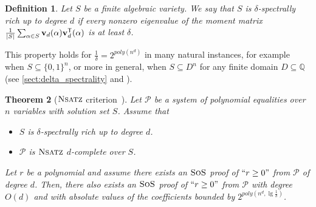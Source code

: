 \documentclass[11pt]{article}
\newcommand{\sos}{\text{\sc{SoS}}}
\newcommand{\Nsatz}{\textsc{Nsatz}}
\newcommand{\1}{\textbf{1}}
\newtheorem{theorem}{Theorem}[section]
\newtheorem{definition}[theorem]{Definition}
\begin{document}
\begin{definition}
    Let $S$ be a finite algebraic variety. We say that $S$ is $\delta$-spectrally rich up to degree $d$ if every nonzero eigenvalue of the moment matrix $\frac{1}{|S|} \sum_{\alpha \in S} \mathbf{v}_d(\alpha)\mathbf{v}_d^{\sf{T}}(\alpha)$ is at least $\delta$.
\end{definition}
This property holds for $\frac{1}{\delta} = 2^{poly(n^d)}$ in many natural instances, for example when $S \subseteq \{0,1\}^n$, or more in general, when $S \subseteq D^n$ for any finite domain $D \subseteq \mathbb{Q}$ (see \cref{sect:delta_spectrality} and \cite{raghavendra_weitz2017}).

\begin{theorem}[$\Nsatz$ criterion~\cite{raghavendra_weitz2017}]\label{th:Nsatz_crit}
    Let $\mathcal{P}$ be a system of polynomial equalities over $n$ variables with solution set $S$. Assume that 
    \begin{itemize}
        \item [(1)] $S$ is $\delta$-spectrally rich up to degree $d$.
        \item [(2)] $\mathcal{P}$ is $\Nsatz$ $d$-complete over $S$.\label{d-comp}
    \end{itemize} 
    Let $r$ be a polynomial and assume there exists an $\sos$ proof of $``r \geq 0"$ from $\mathcal{P}$ of degree $d$. Then, there also exists an $\sos$ proof of $``r \geq 0"$ from $\mathcal{P}$ with degree $O(d)$ and with absolute values of the coefficients bounded by $2^{poly(n^d ,\lg \frac{1}{\delta})}$.
\end{theorem}
\end{document}
